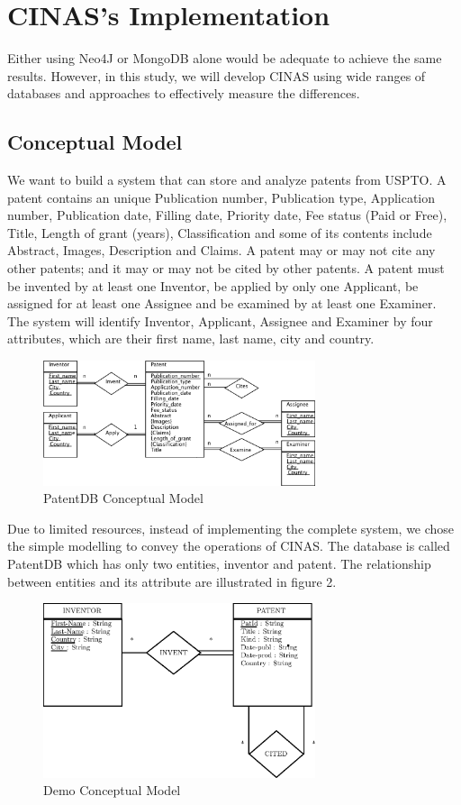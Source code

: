 \documentclass{sig-alternate}
\begin{document}
{\section{CINAS's Implementation }

Either using Neo4J or MongoDB alone would be adequate to achieve the same results. However, in this study, we will develop CINAS using wide ranges of databases and approaches to effectively measure the differences.
\subsection{Conceptual Model}
We want to build a system that can store and analyze patents from USPTO. A patent contains an unique Publication number, Publication type, Application number, Publication date, Filling date, Priority date, Fee status (Paid or Free), Title, Length of grant (years), Classification and some of its contents include Abstract, Images, Description and Claims. A patent may or may not cite any other patents; and it may or may not be cited by other patents. A patent must be invented by at least one Inventor, be applied by only one Applicant, be assigned for at least one Assignee and be examined by at least one Examiner. The system will identify Inventor, Applicant, Assignee and Examiner by four attributes, which are their first name, last name, city and country.

\begin{figure}[htb]
\centering
\includegraphics[width=80mm,scale=10]{erd.png}
\caption{ PatentDB Conceptual Model}
\end{figure}

Due to limited resources, instead of implementing the complete system, we chose the simple modelling to convey the operations of CINAS. The database is called PatentDB which has only two entities, inventor and patent. The relationship between entities and its attribute are illustrated in figure 2. 

\begin{figure}[htb]
\centering
\includegraphics[width=80mm,scale=10]{conceptual_model.eps}
\caption{ Demo Conceptual Model}
\end{figure}

}
\end{document}
